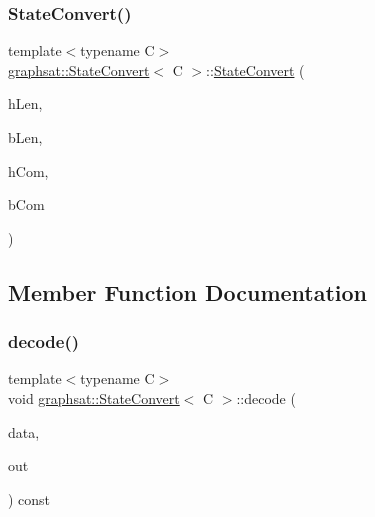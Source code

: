 \mbox{\label{classgraphsat_1_1_state_convert_a1207b78bd7d151c8ce6476d18d535735}} 
\subsubsection{\texorpdfstring{StateConvert()}{StateConvert()}\hspace{0.1cm}{\footnotesize\ttfamily [2/2]}}
{\footnotesize\ttfamily template$<$typename C$>$ \\
\mbox{\hyperlink{classgraphsat_1_1_state_convert}{graphsat\+::\+State\+Convert}}$<$ C $>$\+::\mbox{\hyperlink{classgraphsat_1_1_state_convert}{State\+Convert}} (\begin{DoxyParamCaption}\item[{int}]{h\+Len,  }\item[{int}]{b\+Len,  }\item[{\mbox{\hyperlink{classgraphsat_1_1_compression}{Compression}}$<$ C $>$}]{h\+Com,  }\item[{\mbox{\hyperlink{classgraphsat_1_1_compression}{Compression}}$<$ C $>$}]{b\+Com }\end{DoxyParamCaption})\hspace{0.3cm}{\ttfamily [inline]}}



\subsection{Member Function Documentation}
\mbox{\label{classgraphsat_1_1_state_convert_a63207afc56e9b32bba4ee4477802b6c9}} 
\subsubsection{\texorpdfstring{decode()}{decode()}}
{\footnotesize\ttfamily template$<$typename C$>$ \\
void \mbox{\hyperlink{classgraphsat_1_1_state_convert}{graphsat\+::\+State\+Convert}}$<$ C $>$\+::decode (\begin{DoxyParamCaption}\item[{const \mbox{\hyperlink{namespacegraphsat_aa3b3d61a8c27ffc03448c5e1f3a76aed}{U\+I\+NT}} $\ast$}]{data,  }\item[{C $\ast$}]{out }\end{DoxyParamCaption}) const\hspace{0.3cm}{\ttfamily [inline]}}

